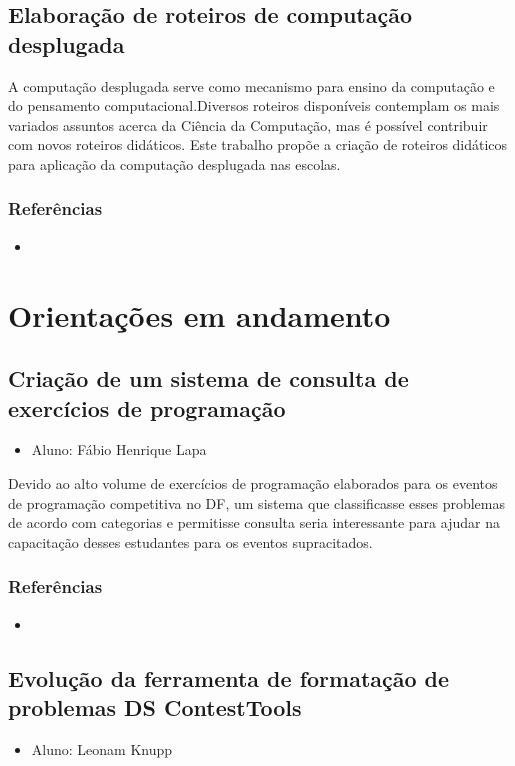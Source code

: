 \documentclass{article}
\newcommand*{\nsubsection}[1]{
    \subsection*{#1}
}
\begin{document}
\nsubsection{Elaboração de roteiros de computação desplugada}

A computação desplugada serve como mecanismo para ensino da computação e do pensamento computacional.Diversos roteiros disponíveis contemplam os mais variados assuntos acerca da Ciência da Computação, mas é possível contribuir com novos roteiros didáticos. Este trabalho propõe a criação de roteiros didáticos para aplicação da computação desplugada nas escolas.

\subsubsection*{Referências}

\begin{itemize}
	\item {}
\end{itemize}

\newpage

\section{Orientações em andamento}



\nsubsection{Criação de um sistema de consulta de exercícios de programação}

\begin{itemize}
	\item Aluno: Fábio Henrique Lapa
\end{itemize}

Devido ao alto volume de exercícios de programação elaborados para os eventos de programação competitiva no DF, um sistema que classificasse esses problemas de acordo com categorias e permitisse consulta seria interessante para ajudar na capacitação desses estudantes para os eventos supracitados.



\subsubsection*{Referências}

\begin{itemize}
	\item {}
\end{itemize}


\nsubsection{Evolução da ferramenta de formatação de problemas DS ContestTools}


\begin{itemize}
	\item Aluno: Leonam Knupp
\end{itemize}
\end{document}
